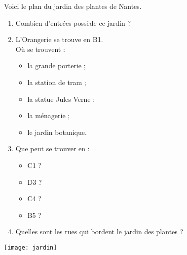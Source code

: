 \begin{exercice}
   Voici le plan du jardin des plantes de Nantes. \\
  \begin{minipage}{7cm}
      \begin{enumerate}
         \item Combien d'entrées possède ce jardin ?
         \item L'Orangerie se trouve en B1. \\
         Où se trouvent :
         \begin{itemize}
            \item la grande porterie ;
            \item la station de tram ;
            \item la statue Jules Verne ;
            \item la ménagerie ;
            \item le jardin botanique.
         \end{itemize}
         \item Que peut se trouver en :
         \begin{itemize}
            \item C1 ?
            \item D3 ?
            \item C4 ?
            \item B5 ?
         \end{itemize}
         \item Quelles sont les rues qui bordent le jardin des plantes ?
      \end{enumerate}
   \end{minipage}
   \qquad
   \begin{minipage}{9.5cm}
      \texttt{[image: jardin]}
   \end{minipage}
   \qquad
\end{exercice}

